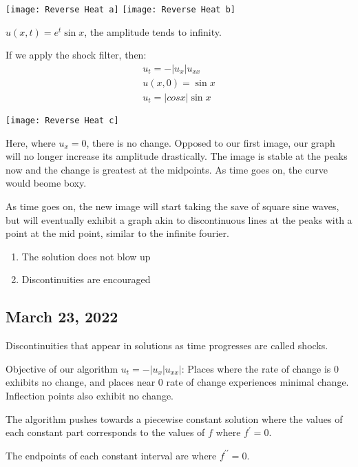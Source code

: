 \begin{center}
  \texttt{[image: Reverse Heat a]}
  \texttt{[image: Reverse Heat b]}
\end{center}

$u(x, t) = e^t \sin x$, the amplitude tends to infinity.

If we apply the shock filter, then:
%
\begin{align*}
  u_t = -|u_x| u_{xx}\\
  u(x, 0) = \sin x\\
  u_t = |cos x| \sin x
\end{align*}

\begin{center}
  \texttt{[image: Reverse Heat c]}
\end{center}

Here, where $u_x = 0$, there is no change. Opposed to our first image, our graph will no longer increase its amplitude drastically. The image is stable at the peaks now and the change is greatest at the midpoints. As time goes on, the curve would beome boxy.

As time goes on, the new image will start taking the save of square sine waves, but will eventually exhibit a graph akin to discontinuous lines at the peaks with a point at the mid point, similar to the infinite fourier.

\note
\begin{enumerate}
  \item The solution does not blow up
  \item Discontinuities are encouraged
\end{enumerate}

\subsection*{March 23, 2022}

\dfn Discontinuities that appear in solutions as time progresses are called shocks.

Objective of our algorithm $u_t = -|u_x| u_{xx}|$: Places where the rate of change is $0$ exhibits no change, and places near $0$ rate of change experiences minimal change. Inflection points also exhibit no change.

The algorithm pushes towards a piecewise constant solution where the values of each constant part corresponds to the values of $f$ where $f^\prime = 0$.

The endpoints of each constant interval are where $f^{\prime\prime} = 0$.

